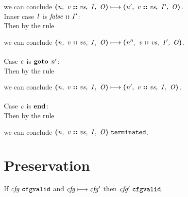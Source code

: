 \documentclass[12pt]{article}
\begin{document}
we can conclude
$\steps{
   \cfg{\nterm{n}}{\cons{\nterm{v}}{\nterm{vs}}}{\nterm{I}}{\nterm{O}}
 }{
   \cfg{\nterm{n'}}{\cons{\nterm{v}}{\nterm{vs}}}{\nterm{I'}}{\nterm{O}}
 }$.\\

Inner case $\nterm{I}$ is $\cons{\nterm{false}}{\nterm{I'}}$:\\

Then by the rule

\begin{mathpar}
\end{mathpar}

we can conclude
$\steps{
   \cfg{\nterm{n}}{\cons{\nterm{v}}{\nterm{vs}}}{\nterm{I}}{\nterm{O}}
 }{
   \cfg{\nterm{n''}}{\cons{\nterm{v}}{\nterm{vs}}}{\nterm{I'}}{\nterm{O}}
 }$.\\
\\

Case $\nterm{c}$ is $\goto{\nterm{n'}}$:\\

Then by the rule

\begin{mathpar}
\end{mathpar}

we can conclude
$\steps{
   \cfg{\nterm{n}}{\cons{\nterm{v}}{\nterm{vs}}}{\nterm{I}}{\nterm{O}}
 }{
   \cfg{\nterm{n'}}{\cons{\nterm{v}}{\nterm{vs}}}{\nterm{I}}{\nterm{O}}
 }$.\\
\\

Case $\nterm{c}$ is $\progend$:\\

Then by the rule

\begin{mathpar}
\end{mathpar}

we can conclude
$\terminated{\cfg{\nterm{n}}{\cons{\nterm{v}}{\nterm{vs}}}{\nterm{I}}{\nterm{O}}}$.

\section{Preservation}

If $\cfgvalid{\nterm{cfg}}$ and $\steps{\nterm{cfg}}{\nterm{cfg'}}$ then
$\cfgvalid{\nterm{cfg'}}$.
\end{document}
